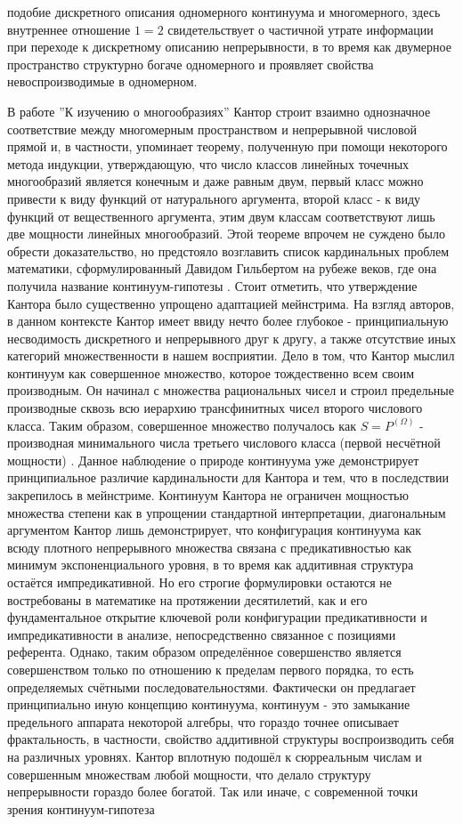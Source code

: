 \documentclass[12pt]{article}
\begin{document}
подобие дискретного описания одномерного континуума и многомерного, здесь внутреннее отношение $1 = 2$ свидетельствует о частичной утрате информации при переходе к дискретному описанию непрерывности, в то время как двумерное пространство структурно богаче одномерного и проявляет свойства невоспроизводимые в одномерном.

В работе ''К изучению о многообразиях'' \cite{cantor-set-study} Кантор строит взаимно однозначное соответствие между многомерным пространством и непрерывной числовой прямой и, в частности, упоминает теорему, полученную при помощи некоторого метода индукции, утверждающую, что число классов линейных точечных многообразий является конечным и даже равным двум, первый класс можно привести к виду функций от натурального аргумента, второй класс - к виду функций от вещественного аргумента, этим двум классам соответствуют лишь две мощности линейных многообразий. Этой теореме впрочем не суждено было обрести доказательство, но предстояло возглавить список кардинальных проблем математики, сформулированный Давидом Гильбертом на рубеже веков, где она получила название континуум-гипотезы \cite{hilbert-problems}. Стоит отметить, что утверждение Кантора было существенно упрощено адаптацией мейнстрима. На взгляд авторов, в данном контексте Кантор имеет ввиду нечто более глубокое - принципиальную несводимость дискретного и непрерывного друг к другу, а также отсутствие иных категорий множественности в нашем восприятии. Дело в том, что Кантор мыслил континуум как совершенное множество, которое тождественно всем своим производным. Он начинал с множества рациональных чисел и строил предельные производные сквозь всю иерархию трансфинитных чисел второго числового класса. Таким образом, совершенное множество получалось как $S = P^(\Omega)$ - производная минимального числа третьего числового класса (первой несчётной мощности) \cite{cantor-perfect-set}. Данное наблюдение о природе континуума уже демонстрирует принципиальное различие кардинальности для Кантора и тем, что в последствии закрепилось в мейнстриме. Континуум Кантора не ограничен мощностью множества степени как в упрощении стандартной интерпретации, диагональным аргументом Кантор лишь демонстрирует, что конфигурация континуума как всюду плотного непрерывного множества связана с предикативностью как минимум экспоненциального уровня, в то время как аддитивная структура остаётся импредикативной. Но его строгие формулировки остаются не востребованы в математике на протяжении десятилетий, как и его фундаментальное открытие ключевой роли конфигурации предикативности и импредикативности в анализе, непосредственно связанное с позициями референта. Однако, таким образом определённое совершенство является совершенством только по отношению к пределам первого порядка, то есть определяемых счётными последовательностями. Фактически он предлагает принципиально иную концепцию континуума, континуум - это замыкание предельного аппарата некоторой алгебры, что гораздо точнее описывает фрактальность, в частности, свойство аддитивной структуры воспроизводить себя на различных уровнях.  Кантор вплотную подошёл к сюрреальным числам и совершенным множествам любой мощности, что делало структуру непрерывности гораздо более богатой. Так или иначе, с современной точки зрения континуум-гипотеза 
\end{document}

